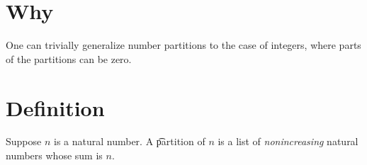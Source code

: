 

\section*{Why}

One can trivially generalize number partitions to the case of integers, where parts of the partitions can be zero.

\section*{Definition}

Suppose $n$ is a natural number.
A \t{partition} of $n$ is a list of \textit{nonincreasing} natural numbers whose sum is $n$.

\blankpage